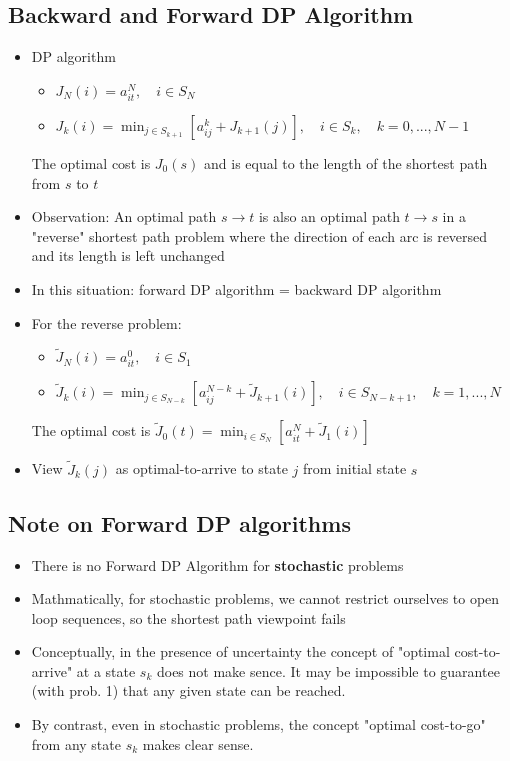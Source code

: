 \subsection{Backward and Forward DP Algorithm}
\begin{itemize}
    \item DP algorithm
    \begin{itemize}
        \item $J_N(i) = a_{it}^N,\quad i\in S_N$
        \item $J_k(i) = \min_{j\in S_{k+1}}[a_{ij}^k+J_{k+1}(j)],\quad i\in S_k,\quad k = 0,...,N-1$
    \end{itemize}
    The optimal cost is $J_0(s)$ and is equal to the length of the shortest path from $s$ to $t$
    \item Observation: An optimal path $s\to t$ is also an optimal path $t\to s$ in a "reverse" shortest path problem where the direction of each arc is reversed and its length is left unchanged
    \item In this situation: forward DP algorithm = backward DP algorithm
    \item For the reverse problem: 
    \begin{itemize}
        \item $\tilde{J}_N(i) = a_{it}^0,\quad i\in S_1$
        \item $\tilde{J}_k(i) = \min_{j\in S_{N-k}}[a_{ij}^{N-k}+\tilde{J}_{k+1}(i)],\quad i\in S_{N-k+1},\quad k = 1,...,N$
    \end{itemize}
    The optimal cost is $\tilde{J}_0(t) = \min_{i\in S_N} [a_{it}^N + \tilde{J}_1(i)]$
    \item View $\tilde{J}_k(j)$ as optimal-to-arrive to state $j$ from initial state $s$
\end{itemize}

\subsection{Note on Forward DP algorithms}
\begin{itemize}
    \item There is no Forward DP Algorithm for \textbf{stochastic} problems
    \item Mathmatically, for stochastic problems, we cannot restrict ourselves to open loop sequences, so the shortest path viewpoint fails
    \item Conceptually, in the presence of uncertainty the concept of "optimal cost-to-arrive" at a state $s_k$ does not make sence. It may be impossible to guarantee (with prob. 1) that any given state can be reached.
    \item By contrast, even in stochastic problems, the concept "optimal cost-to-go" from any state $s_k$ makes clear sense.
\end{itemize}

